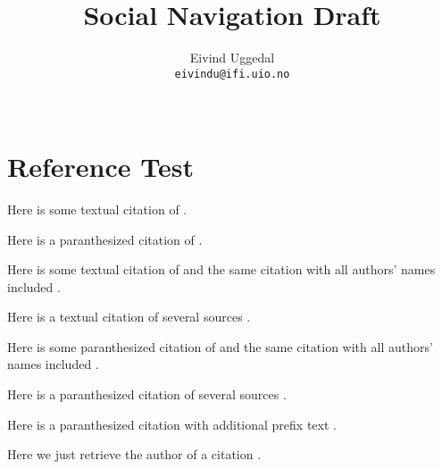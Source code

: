 \documentclass[11pt,a4paper,twoside]{book}
\title{Social Navigation Draft}
\author{Eivind Uggedal\\
        \texttt{eivindu@ifi.uio.no}\\\\
        }
\begin{document}
  \frontmatter
    \maketitle
    \tableofcontents
  \mainmatter
    

    \chapter{Reference Test}
    Here is some textual citation of \citet{bush45}.

    Here is a paranthesized citation of \citep{dieberger97}.

    Here is some textual citation of \citet{dieberger00} and the same
    citation with all authors' names included \citet*{dieberger00}.

    Here is a textual citation of several sources
    \citet{dourish94,golder05}.

    Here is some paranthesized citation of \citet{hill92} and the same
    citation with all authors' names included \citet*{hill92}.

    Here is a paranthesized citation of several sources
    \citep{hill94,ohalloran07}.

    Here is a paranthesized citation with additional prefix text
    \citep[online from]{places07}.

    Here we just retrieve the author of a citation \citeauthor{wexelblat99}.

    \begin{appendices}
      
      
    \end{appendices}
  \backmatter
    
    
\end{document}
